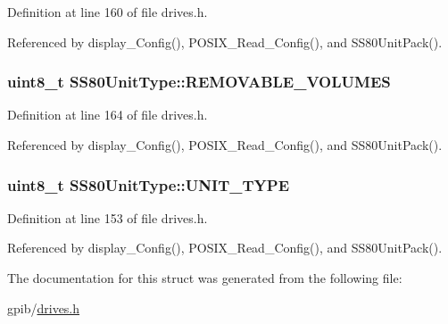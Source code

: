 Definition at line 160 of file drives.\+h.



Referenced by display\+\_\+\+Config(), P\+O\+S\+I\+X\+\_\+\+Read\+\_\+\+Config(), and S\+S80\+Unit\+Pack().

\subsubsection[{\texorpdfstring{R\+E\+M\+O\+V\+A\+B\+L\+E\+\_\+\+V\+O\+L\+U\+M\+ES}{REMOVABLE_VOLUMES}}]{\setlength{\rightskip}{0pt plus 5cm}uint8\+\_\+t S\+S80\+Unit\+Type\+::\+R\+E\+M\+O\+V\+A\+B\+L\+E\+\_\+\+V\+O\+L\+U\+M\+ES}\hypertarget{structSS80UnitType_a6dcef2939bd0a19951ad1592b1ec8c31}{}\label{structSS80UnitType_a6dcef2939bd0a19951ad1592b1ec8c31}


Definition at line 164 of file drives.\+h.



Referenced by display\+\_\+\+Config(), P\+O\+S\+I\+X\+\_\+\+Read\+\_\+\+Config(), and S\+S80\+Unit\+Pack().

\subsubsection[{\texorpdfstring{U\+N\+I\+T\+\_\+\+T\+Y\+PE}{UNIT_TYPE}}]{\setlength{\rightskip}{0pt plus 5cm}uint8\+\_\+t S\+S80\+Unit\+Type\+::\+U\+N\+I\+T\+\_\+\+T\+Y\+PE}\hypertarget{structSS80UnitType_ae00e42430682e849d83b1ca4c8f44013}{}\label{structSS80UnitType_ae00e42430682e849d83b1ca4c8f44013}


Definition at line 153 of file drives.\+h.



Referenced by display\+\_\+\+Config(), P\+O\+S\+I\+X\+\_\+\+Read\+\_\+\+Config(), and S\+S80\+Unit\+Pack().



The documentation for this struct was generated from the following file\+:\begin{DoxyCompactItemize}
\item 
gpib/\hyperlink{drives_8h}{drives.\+h}\end{DoxyCompactItemize}
